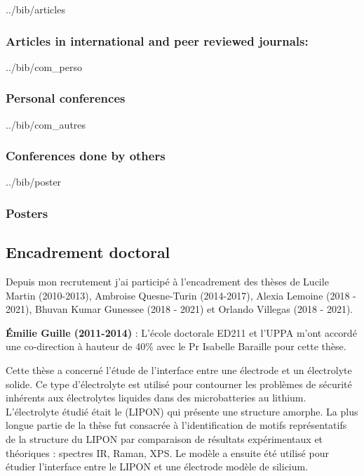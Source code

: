 \documentclass[11pt]{artuppax}
\newcounter{subsec}[section]
\begin{document}
\begin{btSect}{../bib/articles}
    \subsubsection{Articles in international and peer reviewed journals:}
    \smallskip
    \btPrintAll
\end{btSect}

\begin{btSect}{../bib/com_perso}
    \subsubsection{Personal conferences}
    \smallskip
    \btPrintAll
\end{btSect}

\begin{btSect}{../bib/com_autres}
    \subsubsection{Conferences done by others}
    \smallskip
    \btPrintAll
\end{btSect}

\begin{btSect}{../bib/poster}
    \subsubsection{Posters}
    \smallskip
    \btPrintAll
\end{btSect}


\subsection{Encadrement doctoral}

Depuis mon recrutement j'ai participé à l'encadrement des thèses de
Lucile Martin (2010-2013), Ambroise Quesne-Turin (2014-2017), 
Alexia Lemoine (2018 - 2021), Bhuvan Kumar Gunessee (2018 - 2021) 
et Orlando Villegas (2018 - 2021).

\textbf{Émilie Guille (2011-2014)} :
L'école doctorale ED211 et l'UPPA m'ont accordé une co-direction
à hauteur de 40\% avec le Pr Isabelle Baraille pour cette thèse.

Cette thèse a concerné l'étude de l'interface entre une électrode et un électrolyte
solide. Ce type d'électrolyte est utilisé pour contourner les problèmes de sécurité
inhérents aux électrolytes liquides dans des microbatteries au lithium. L'électrolyte
étudié était le  (LIPON) qui présente une structure amorphe. La plus
longue partie de la thèse fut consacrée à l'identification de motifs représentatifs de
la structure du LIPON par comparaison de résultats expérimentaux et théoriques :
spectres IR, Raman, XPS. Le modèle a ensuite été utilisé pour étudier l'interface
entre le LIPON et une électrode modèle de silicium.
\end{document}
